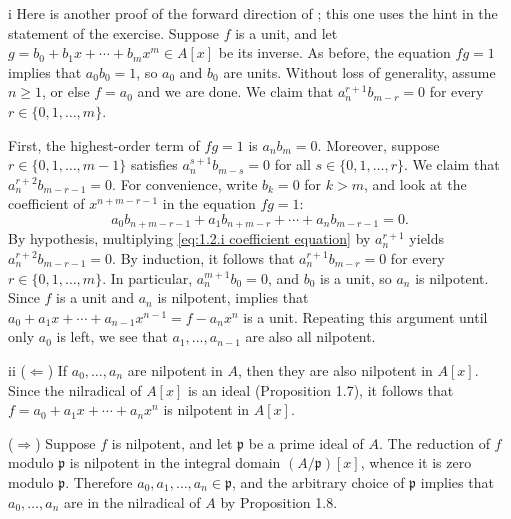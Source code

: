 \begin{altpartsolution}{i}
Here is another proof of the forward direction of ; this one uses the hint in the statement of the exercise.
Suppose \(f\) is a unit, and let \(g = b_0 + b_1 x + \cdots + b_m x^m \in A[x]\) be its inverse.
As before, the equation \(f g = 1\) implies that \(a_0 b_0 = 1\), so \(a_0\) and \(b_0\) are units.
Without loss of generality, assume \(n \geq 1\), or else \(f = a_0\) and we are done.
We claim that \(a_n^{r + 1} b_{m - r} = 0\) for every \(r \in \{0, 1, \ldots, m\}\).

First, the highest-order term of \(f g = 1\) is \(a_n b_m = 0\).
Moreover, suppose \(r \in \{0, 1, \ldots, m - 1\}\) satisfies \(a_n^{s + 1} b_{m - s} = 0\) for all \(s \in \{0, 1, \ldots, r\}\).
We claim that \(a_n^{r + 2} b_{m - r - 1} = 0\).
For convenience, write \(b_k = 0\) for \(k > m\), and look at the coefficient of \(x^{n + m - r - 1}\) in the equation \(f g = 1\):
\begin{equation}
\label{eq:1.2.i coefficient equation}
a_0 b_{n + m - r - 1} + a_1 b_{n + m - r} + \cdots + a_{n} b_{m - r - 1} = 0.
\end{equation}
By hypothesis, multiplying \eqref{eq:1.2.i coefficient equation} by \(a_n^{r + 1}\) yields \(a_n^{r + 2} b_{m - r - 1} = 0\).
By induction, it follows that \(a_n^{r + 1} b_{m - r} = 0\) for every \(r \in \{0, 1, \ldots, m\}\).
In particular, \(a_n^{m + 1} b_0 = 0\), and \(b_0\) is a unit, so \(a_n\) is nilpotent.
Since \(f\) is a unit and \(a_n\) is nilpotent,  implies that \(a_0 + a_1 x + \cdots + a_{n - 1} x^{n - 1} = f - a_n x^n\) is a unit.
Repeating this argument until only \(a_0\) is left, we see that \(a_1, \ldots, a_{n - 1}\) are also all nilpotent.
\end{altpartsolution}

\begin{partsolution}{ii}
(\(\Leftarrow\))
If \(a_0,\ldots,a_n\) are nilpotent in \(A\), then they are also nilpotent in \(A[x]\).
Since the nilradical of \(A[x]\) is an ideal (Proposition 1.7), it follows that \(f = a_0 + a_1 x + \cdots + a_n x^n\) is nilpotent in \(A[x]\).

(\(\Rightarrow\))
Suppose \(f\) is nilpotent, and let \(\mathfrak p\) be a prime ideal of \(A\).
The reduction of \(f\) modulo \(\mathfrak p\) is nilpotent in the integral domain \((A/\mathfrak p)[x]\), whence it is zero modulo \(\mathfrak p\).
Therefore \(a_0,a_1,\ldots,a_n \in \mathfrak p\), and the arbitrary choice of \(\mathfrak p\) implies that \(a_0,\ldots,a_n\) are in the nilradical of \(A\) by Proposition 1.8.
\end{partsolution}

